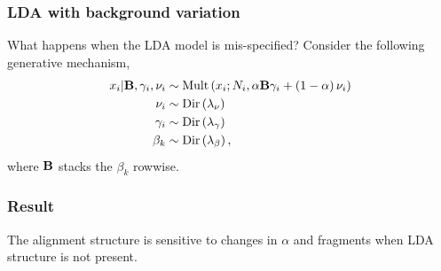 \documentclass[hyperref={colorlinks=true, linkcolor=violet, citecolor=SeaGreen}]{beamer}
\begin{document}
\begin{frame}
  \frametitle{LDA with background variation}
  What happens when the LDA model is mis-specified? Consider the following
  generative mechanism,
  \begin{align*}
x_{i} \vert \mathbf{B}, \gamma_{i}, \nu_i &\sim \text{Mult}\left(x_{i} ; N_{i}, \alpha \mathbf{B}\gamma_{i} + \left(1 - \alpha\right)\nu_i\right) \\
\nu_{i} &\sim \text{Dir}\left(\lambda_{\nu}\right) \\
\gamma_i &\sim \text{Dir}\left(\lambda_{\gamma}\right) \\
\beta_{k} &\sim \text{Dir}\left(\lambda_{\beta}\right),
\end{align*}
where $\mathbf{B}$ stacks the $\beta_k$ rowwise.
\end{frame}

\begin{frame}
  \frametitle{Result}
  The alignment structure is sensitive to changes in $\alpha$ and fragments when
  LDA structure is not present.

\begin{figure}
    \hfil
\end{figure}

\end{frame}
\end{document}
